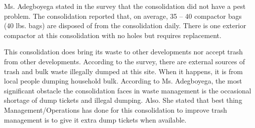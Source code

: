  

Ms. Adegboyega stated in the survey that the consolidation did not have a pest problem. The consolidation reported that, on average, 35 -- 40 compactor bags (40 lbs. bags)  are disposed of from the consolidation daily. There is one exterior compactor at this consolidation with no holes but requires replacement. 

This consolidation does bring its waste to other developments nor accept trash from other developments. According to the survey, there are external sources of trash and bulk waste illegally dumped at this site. When it happens, it is from local people dumping household bulk. According to Ms. Adegboyega, the most significant obstacle the consolidation faces in waste management is the occasional shortage of dump tickets and illegal dumping. Also. She stated that best thing Management/Operations has done for this consolidation to improve trash management is to give it extra dump tickets when available.